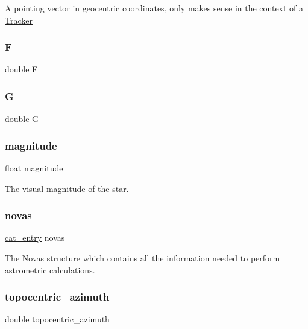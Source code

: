 A pointing vector in geocentric coordinates, only makes sense in the context of a \mbox{\hyperlink{struct_tracker}{Tracker}} \mbox{\label{struct_entry_ae3520ebb3ff8d6feab3e6afb47ed4040}} 
\subsubsection{\texorpdfstring{F}{F}}
{\footnotesize\ttfamily double F}

\mbox{\label{struct_entry_a67783a2c4f670ee5a9dadcf428324d32}} 
\subsubsection{\texorpdfstring{G}{G}}
{\footnotesize\ttfamily double G}

\mbox{\label{struct_entry_a90598eb01c338f4bbab41ad4aab9fcc0}} 
\subsubsection{\texorpdfstring{magnitude}{magnitude}}
{\footnotesize\ttfamily float magnitude}

The visual magnitude of the star. \mbox{\label{struct_entry_ac03920d0c64ed555ac71b25d04edd35e}} 
\subsubsection{\texorpdfstring{novas}{novas}}
{\footnotesize\ttfamily \mbox{\hyperlink{novas_8h_a262daaa71cede05205cfaa727313c1f3}{cat\+\_\+entry}} novas}

The Novas structure which contains all the information needed to perform astrometric calculations. \mbox{\label{struct_entry_a3aedc50fa1c1d11c9d2c89c341a0b866}} 
\subsubsection{\texorpdfstring{topocentric\+\_\+azimuth}{topocentric\_azimuth}}
{\footnotesize\ttfamily double topocentric\+\_\+azimuth}

